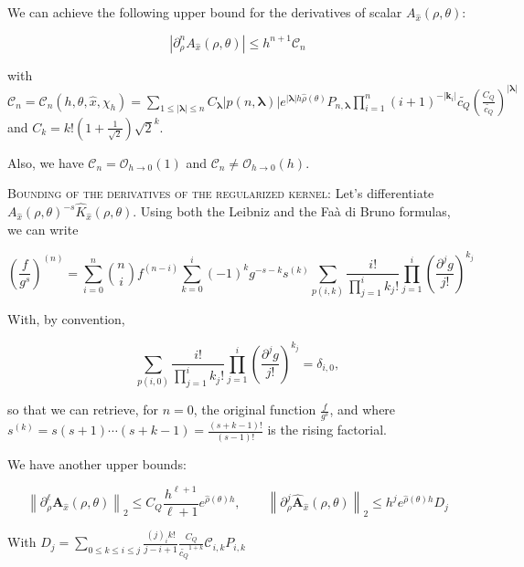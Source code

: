﻿\documentclass{article}
\begin{document}
\begin{lemma}\label{lemma:majoration-derivatives-A}
  We can achieve the following upper bound for the derivatives of scalar $A_{\hat x}(\rho, \theta)$:

\begin{equation}
  \left|\partial^n_{\rho} A_{\hat x}(\rho, \theta)\right| \leq h^{n+1}\mathcal C_n
\end{equation}

with $\displaystyle{\mathcal C_n = \mathcal C_n(h, \theta, \hat x, \chi_h) = \sum_{1\leq|\bm\lambda|\leq n}C_{\bm\lambda}|p(n, \bm\lambda)|e^{|\bm\lambda|h\hat\rho(\theta)}P_{n, \bm\lambda}\prod_{i=1}^{n}(i+1)^{-|\bm k_i|}\widetilde{c_Q}\left(\frac{C_Q}{\widetilde{c_Q}}\right)^{|\bm\lambda|}}$ and $C_k = k!\left(1+\frac{1}{\sqrt 2}\right)\sqrt 2^{k}$.

Also, we have $\mathcal C_n = \mathcal O_{h\to 0}(1)$ and $\mathcal C_n \neq \mathcal O_{h\to 0}(h)$.
\end{lemma}

\textsc{Bounding of the derivatives of the regularized kernel}: Let's differentiate $A_{\hat x}(\rho, \theta)^{-s} \hat K_{\hat x}(\rho, \theta)$. Using both the Leibniz and the Faà di Bruno formulas, we can write

\begin{equation}\label{eq:faa-di-bruno_quotient_power}
  \left(\frac{f}{g^s}\right)^{(n)} = \sum_{i=0}^{n}\binom{n}{i}f^{(n-i)}\sum_{k=0}^{i}(-1)^kg^{-s-k}s^{(k)}\sum_{p(i, k)}\frac{i!}{\prod_{j=1}^{i}k_j!}\prod_{j=1}^{i}\left(\frac{\partial^jg}{j!}\right)^{k_j}
\end{equation}

With, by convention, 

$$\displaystyle{\sum_{p(i, 0)}\frac{i!}{\prod_{j=1}^{i}k_j!}\prod_{j=1}^{i}\left(\frac{\partial^jg}{j!}\right)^{k_j}} = \delta_{i,0},$$

so that we can retrieve, for $n = 0$, the original function $\displaystyle{\frac{f}{g^s}}$, and where $\displaystyle{s^{(k)} = s(s+1)\cdots(s+k-1) = \frac{(s+k-1)!}{(s-1)!}}$ is the rising factorial.

\begin{lemma}\label{lemma:majoration-derivatives-A-vector}
  We have another upper bounds:

\begin{equation}
  \left\|\partial^\ell_\rho\bm A_{\hat x}(\rho, \theta)\right\|_2\leq C_Q\frac{h^{\ell+1}}{\ell+1}e^{\hat\rho(\theta)h}, \qquad \left\|\partial^j_\rho\hat{\bm A}_{\hat x}(\rho, \theta)\right\|_2\leq h^{j}e^{\hat\rho(\theta)h}D_j
\end{equation}

With $\displaystyle{D_j = \sum_{0\leq k\leq i\leq j}}\frac{(j)_ik!}{j-i+1}\frac{C_Q}{\widetilde{c_Q}^{1+k}}\mathcal C_{i,k}P_{i,k}$

\end{lemma}
\end{document}
